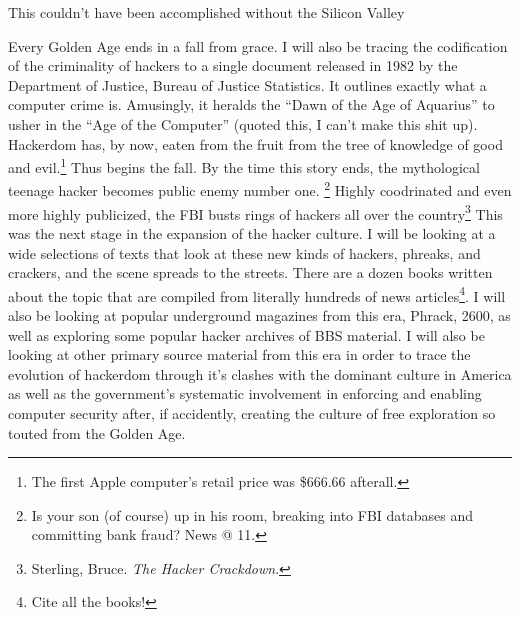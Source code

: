 \documentclass[11pt]{article}
\begin{document}
This couldn't have been accomplished without the Silicon Valley 

Every Golden Age ends in a fall from grace. I will also be tracing the codification of the criminality of hackers to a single document released in 1982 by the Department of Justice, Bureau of Justice Statistics.  It outlines exactly what a computer crime is. Amusingly, it heralds the “Dawn of the Age of Aquarius” to usher in the “Age of the Computer” (quoted this, I can’t make this shit up). Hackerdom has, by now, eaten from the fruit from the tree of knowledge of good and evil.\footnote{The first Apple computer's retail price was \$666.66 afterall.}  Thus begins the fall. By the time this story ends, the mythological teenage hacker becomes public enemy number one. \footnote{Is your son (of course) up in his room, breaking into FBI databases and committing bank fraud? News @ 11.} Highly coodrinated and even more highly publicized, the FBI busts rings of hackers all over the country\footnote{Sterling, Bruce. \emph{The Hacker Crackdown}. } This was the next stage in the expansion of the hacker culture. I will be looking at a wide selections of texts that look at these new kinds of hackers, phreaks, and crackers, and the scene spreads to the streets. There are a dozen books written about the topic that are compiled from literally hundreds of news articles\footnote{Cite all the books!}. I will also be looking at popular underground magazines from this era, Phrack, 2600, as well as exploring some popular hacker archives of BBS material. I will also be looking at other primary source material from this era in order to trace the evolution of hackerdom through it’s clashes with the dominant culture in America as well as the government’s systematic involvement in enforcing and enabling computer security after, if accidently, creating the culture of free exploration so touted from the Golden Age.
\end{document}
